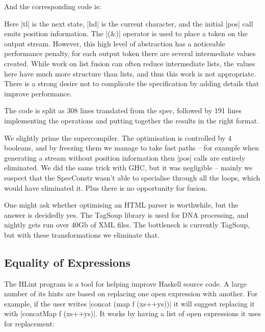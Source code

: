 \documentclass{sigplanconf}
\begin{document}
And the corresponding code is:


Here |tl| is the next state, |hd| is the current character, and the initial |pos| call emits position information. The |(&)| operator is used to place a token on the output stream. However, this high level of abstraction has a noticeable performance penalty, for each output token there are several intermediate values created. While work on list fusion can often reduce intermediate lists, the values here have much more structure than lists, and thus this work is not appropriate. There is a strong desire not to complicate the specification by adding details that improve performance.

The code is split as 308 lines translated from the spec, followed by 191 lines implementing the operations and putting together the results in the right format.

We slightly prime the supercompiler. The optimisation is controlled by 4 booleans, and by freezing them we manage to take fast paths -- for example when generating a stream without position information then |pos| calls are entirely eliminated. We did the same trick with GHC, but it was negligible -- mainly we suspect that the SpecConstr wasn't able to specialise through all the loops, which would have eliminated it. Plus there is no opportunity for fusion.

One might ask whether optimising an HTML parser is worthwhile, but the answer is decidedly yes. The TagSoup library is used for DNA processing, and nightly gets run over 40Gb of XML files. The bottleneck is currently TagSoup, but with these transformations we eliminate that.

\subsection{Equality of Expressions}
\label{sec:hlint}

The HLint program \cite{hlint} is a tool for helping improve Haskell source code. A large number of its hints are based on replacing one open expression with another. For example, if the user writes |concat (map f (xs++ys))| it will suggest replacing it with |concatMap f (xs++ys)|. It works by having a list of open expressions it uses for replacement:
\end{document}
